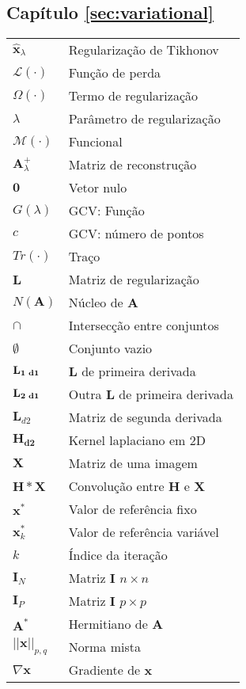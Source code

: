 \begin{multicols}{2}
\subsection*{Capítulo \ref{sec:variational}}
\noindent\begin{tabular}{ m{1.3cm} m{6.2cm}}
$\hat{\mathbf{x}}_{\lambda}$ &Regularização de Tikhonov   \\
$\mathcal{L}(\cdot)$ &Função de perda  \\
$\Omega(\cdot)$ &Termo de regularização  \\
$\lambda$ &Parâmetro de regularização  \\
$\mathcal{M}(\cdot)$ &Funcional  \\
$ \mathbf{A}^+_{\lambda}$ &Matriz de reconstrução \\
$\mathbf{0}$ & Vetor nulo\\
$G(\lambda)$ &GCV: Função\\
$c$& GCV: número de pontos \\
$Tr(\cdot)$ &Traço  \\
$\mathbf{L}$ &Matriz de regularização  \\
$N(\mathbf{A})$ & Núcleo de $\mathbf{A}$ \\ 
$\cap$& Intersecção entre conjuntos \\ 
$\emptyset$& Conjunto vazio \\ 
$\mathbf{L_{1 \hspace{1mm} d1}}$ & $\mathbf{L}$ de primeira derivada \\
$\mathbf{L_{2 \hspace{1mm} d1}}$ & Outra $\mathbf{L}$ de primeira derivada \\
$\mathbf{L}_{d2}$ & Matriz de segunda derivada \\
$\mathbf{H_{d2}}$ & Kernel laplaciano em 2D\\
$\mathbf{X}$ &Matriz de uma imagem\\
$\mathbf{H} * \mathbf{X}$ & Convolução entre $\mathbf{H}$ e $\mathbf{X}$ \\
$\mathbf{x}^*$ &Valor de referência fixo \\
$\mathbf{x}^*_k$ &Valor de referência variável \\
$k$ & Índice da iteração \\
$\mathbf{I}_N$ & Matriz $\mathbf{I}$  $n \times n$ \\
$\mathbf{I}_P$ & Matriz $\mathbf{I}$  $p \times p$\\
$\mathbf{A}^*$ & Hermitiano de $\mathbf{A}$\\
$\vert\vert \mathbf{x} \vert\vert_{p,q}$ & Norma mista \\
$\nabla \mathbf{x}$ &  Gradiente de $\mathbf{x}$\\
\end{tabular}


\end{multicols}
